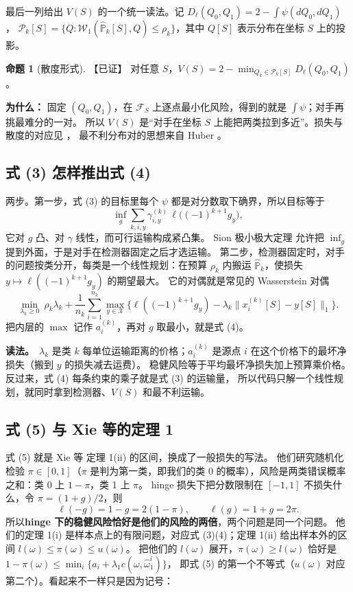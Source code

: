 \documentclass[11pt,a4paper,fontset=none]{ctexart}
\theoremstyle{definition}
\newtheorem{proposition}{命题}
\newenvironment{why}{\par\noindent\textbf{为什么：}\ignorespaces}{\par}
\newcommand{\para}[1]{\par\smallskip\noindent\textbf{#1}\ }
\newcommand{\status}[1]{\textrm{【#1】}}
\begin{document}
最后一列给出 $V(S)$ 的一个统一读法。记 $D_\ell(Q_0,Q_1)=2-\int\psi(dQ_0,dQ_1)$，
$\mathcal P_k[S]=\{Q:\mathcal W_1(\widehat{\mathbb P}_k[S],Q)\le\rho_k\}$，其中 $Q[S]$ 表示分布在坐标 $S$ 上的投影。

\begin{proposition}[散度形式]\label{prop:divergence}\status{已证}
对任意 $S$，$V(S)=2-\min_{Q_k\in\mathcal P_k[S]}D_\ell(Q_0,Q_1)$。
\end{proposition}
\begin{why}
固定 $(Q_0,Q_1)$，在 $\mathcal F_S$ 上逐点最小化风险，得到的就是 $\int\psi$；对手再挑最难分的一对。
所以 $V(S)$ 是“对手在坐标 $S$ 上能把两类拉到多近”。损失与散度的对应见 \cite{nguyen2009surrogate,reid2011information}，
最不利分布对的思想来自 Huber \cite{huber1965robust,huber1973minimax}。
\end{why}

\subsection{式 (3) 怎样推出式 (4)}
两步。第一步，式 (3) 的目标里每个 $\psi$ 都是对分数取下确界，所以目标等于
\[
\inf_g\sum_{k,i,y}\gamma^{(k)}_{i,y}\,\ell\bigl((-1)^{k+1}g_y\bigr),
\]
它对 $g$ 凸、对 $\gamma$ 线性，而可行运输构成紧凸集。
Sion 极小极大定理 \cite{sion1958minimax} 允许把 $\inf_g$ 提到外面，于是对手在检测器固定之后才选运输。
第二步，检测器固定时，对手的问题按类分开，每类是一个线性规划：在预算 $\rho_k$ 内搬运 $\widehat{\mathbb P}_k$，使损失 $y\mapsto\ell((-1)^{k+1}g_y)$ 的期望最大。
它的对偶就是常见的 Wasserstein 对偶
\[
\min_{\lambda_k\ge0}\ \rho_k\lambda_k+\frac1{n_k}\sum_{i=1}^{n_k}\max_{y\in\mathcal X}\bigl\{\ell((-1)^{k+1}g_y)-\lambda_k\|x^{(k)}_i[S]-y[S]\|_1\bigr\}.
\]
把内层的 $\max$ 记作 $a^{(k)}_i$，再对 $g$ 取最小，就是式 (4)。

\para{读法。}$\lambda_k$ 是类 $k$ 每单位运输距离的价格；$a^{(k)}_i$ 是源点 $i$ 在这个价格下的最坏净损失（搬到 $y$ 的损失减去运费）。
稳健风险等于平均最坏净损失加上预算乘价格。反过来，式 (4) 每条约束的乘子就是式 (3) 的运输量，
所以代码只解一个线性规划，就同时拿到检测器、$V(S)$ 和最不利运输。

\subsection{式 (5) 与 Xie 等的定理 1}
式 (5) 就是 Xie 等 \cite{xie2021robust} 定理 1(ii) 的区间，换成了一般损失的写法。
他们研究随机化检验 $\pi\in[0,1]$（$\pi$ 是判为第一类，即我们的类 0 的概率），风险是两类错误概率之和：类 0 上 $1-\pi$，类 1 上 $\pi$。
hinge 损失下把分数限制在 $[-1,1]$ 不损失什么，令 $\pi=(1+g)/2$，则
\[
\ell(-g)=1-g=2(1-\pi),\qquad \ell(g)=1+g=2\pi .
\]
所以\textbf{hinge 下的稳健风险恰好是他们的风险的两倍}，两个问题是同一个问题。
他们的定理 1(i) 是样本点上的有限问题，对应式 (3)(4)；定理 1(ii) 给出样本外的区间 $l(\omega)\le\pi(\omega)\le u(\omega)$。
把他们的 $l(\omega)$ 展开，$\pi(\omega)\ge l(\omega)$ 恰好是 $1-\pi(\omega)\le\min_i\{a_i+\lambda_1c(\omega,\widehat\omega_1^i)\}$，
即式 (5) 的第一个不等式（$u(\omega)$ 对应第二个）。看起来不一样只是因为记号：
\end{document}
